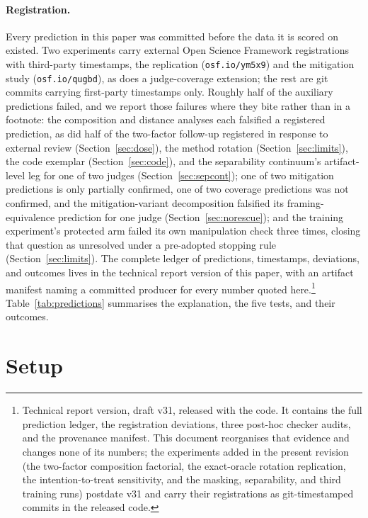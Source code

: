 \documentclass[11pt]{article}
\begin{document}
\paragraph{Registration.}
Every prediction in this paper was committed before the data it is scored on existed.
Two experiments carry external Open Science Framework registrations with third-party timestamps, the replication (\texttt{osf.io/ym5x9}) and the mitigation study (\texttt{osf.io/qugbd}), as does a judge-coverage extension; the rest are git commits carrying first-party timestamps only.
Roughly half of the auxiliary predictions failed, and we report those failures where they bite rather than in a footnote: the composition and distance analyses each falsified a registered prediction, as did half of the two-factor follow-up registered in response to external review (Section~\ref{sec:dose}), the method rotation (Section~\ref{sec:limits}), the code exemplar (Section~\ref{sec:code}), and the separability continuum's artifact-level leg for one of two judges (Section~\ref{sec:sepcont}); one of two mitigation predictions is only partially confirmed, one of two coverage predictions was not confirmed, and the mitigation-variant decomposition falsified its framing-equivalence prediction for one judge (Section~\ref{sec:norescue}); and the training experiment's protected arm failed its own manipulation check three times, closing that question as unresolved under a pre-adopted stopping rule (Section~\ref{sec:limits}).
The complete ledger of predictions, timestamps, deviations, and outcomes lives in the technical report version of this paper, with an artifact manifest naming a committed producer for every number quoted here.\footnote{Technical report version, draft v31, released with the code. It contains the full prediction ledger, the registration deviations, three post-hoc checker audits, and the provenance manifest. This document reorganises that evidence and changes none of its numbers; the experiments added in the present revision (the two-factor composition factorial, the exact-oracle rotation replication, the intention-to-treat sensitivity, and the masking, separability, and third training runs) postdate v31 and carry their registrations as git-timestamped commits in the released code.}
Table~\ref{tab:predictions} summarises the explanation, the five tests, and their outcomes.

\section{Setup}
\label{sec:setup}
\end{document}
